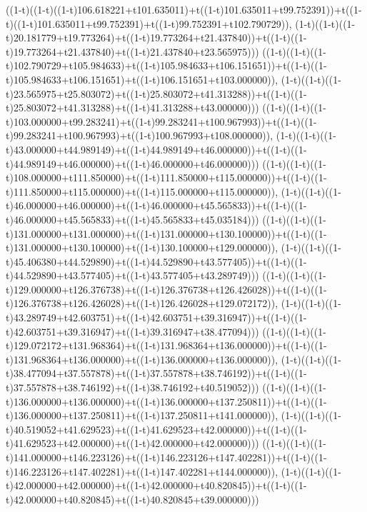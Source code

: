 ((1-t)((1-t)((1-t)106.618221+t101.635011)+t((1-t)101.635011+t99.752391))+t((1-t)((1-t)101.635011+t99.752391)+t((1-t)99.752391+t102.790729)),                                     (1-t)((1-t)((1-t)20.181779+t19.773264)+t((1-t)19.773264+t21.437840))+t((1-t)((1-t)19.773264+t21.437840)+t((1-t)21.437840+t23.565975)))
((1-t)((1-t)((1-t)102.790729+t105.984633)+t((1-t)105.984633+t106.151651))+t((1-t)((1-t)105.984633+t106.151651)+t((1-t)106.151651+t103.000000)),                                     (1-t)((1-t)((1-t)23.565975+t25.803072)+t((1-t)25.803072+t41.313288))+t((1-t)((1-t)25.803072+t41.313288)+t((1-t)41.313288+t43.000000)))
((1-t)((1-t)((1-t)103.000000+t99.283241)+t((1-t)99.283241+t100.967993))+t((1-t)((1-t)99.283241+t100.967993)+t((1-t)100.967993+t108.000000)),                                     (1-t)((1-t)((1-t)43.000000+t44.989149)+t((1-t)44.989149+t46.000000))+t((1-t)((1-t)44.989149+t46.000000)+t((1-t)46.000000+t46.000000)))
((1-t)((1-t)((1-t)108.000000+t111.850000)+t((1-t)111.850000+t115.000000))+t((1-t)((1-t)111.850000+t115.000000)+t((1-t)115.000000+t115.000000)),                                     (1-t)((1-t)((1-t)46.000000+t46.000000)+t((1-t)46.000000+t45.565833))+t((1-t)((1-t)46.000000+t45.565833)+t((1-t)45.565833+t45.035184)))
((1-t)((1-t)((1-t)131.000000+t131.000000)+t((1-t)131.000000+t130.100000))+t((1-t)((1-t)131.000000+t130.100000)+t((1-t)130.100000+t129.000000)),                                     (1-t)((1-t)((1-t)45.406380+t44.529890)+t((1-t)44.529890+t43.577405))+t((1-t)((1-t)44.529890+t43.577405)+t((1-t)43.577405+t43.289749)))
((1-t)((1-t)((1-t)129.000000+t126.376738)+t((1-t)126.376738+t126.426028))+t((1-t)((1-t)126.376738+t126.426028)+t((1-t)126.426028+t129.072172)),                                     (1-t)((1-t)((1-t)43.289749+t42.603751)+t((1-t)42.603751+t39.316947))+t((1-t)((1-t)42.603751+t39.316947)+t((1-t)39.316947+t38.477094)))
((1-t)((1-t)((1-t)129.072172+t131.968364)+t((1-t)131.968364+t136.000000))+t((1-t)((1-t)131.968364+t136.000000)+t((1-t)136.000000+t136.000000)),                                     (1-t)((1-t)((1-t)38.477094+t37.557878)+t((1-t)37.557878+t38.746192))+t((1-t)((1-t)37.557878+t38.746192)+t((1-t)38.746192+t40.519052)))
((1-t)((1-t)((1-t)136.000000+t136.000000)+t((1-t)136.000000+t137.250811))+t((1-t)((1-t)136.000000+t137.250811)+t((1-t)137.250811+t141.000000)),                                     (1-t)((1-t)((1-t)40.519052+t41.629523)+t((1-t)41.629523+t42.000000))+t((1-t)((1-t)41.629523+t42.000000)+t((1-t)42.000000+t42.000000)))
((1-t)((1-t)((1-t)141.000000+t146.223126)+t((1-t)146.223126+t147.402281))+t((1-t)((1-t)146.223126+t147.402281)+t((1-t)147.402281+t144.000000)),                                     (1-t)((1-t)((1-t)42.000000+t42.000000)+t((1-t)42.000000+t40.820845))+t((1-t)((1-t)42.000000+t40.820845)+t((1-t)40.820845+t39.000000)))
